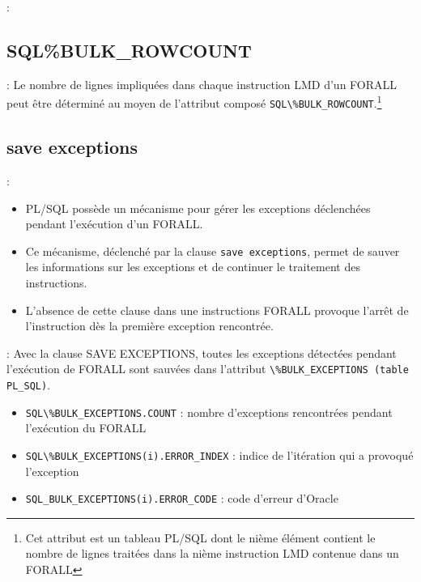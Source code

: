 \documentclass[10pt]{beamer}
\begin{document}
\begin{frame}[allowframebreaks]{\secname : \subsecname}
    
\end{frame}

\subsection{SQL\%BULK\_ROWCOUNT}
\begin{frame}{\secname : \subsecname}
    Le nombre de lignes impliquées dans chaque instruction LMD d'un FORALL peut être déterminé au moyen de l'attribut composé \lstinline[language=plsql]!SQL\%BULK_ROWCOUNT!.\footnote{Cet attribut est un tableau PL/SQL dont le nième élément contient le nombre de lignes traitées dans la nième instruction LMD contenue dans un FORALL}
\end{frame}

\subsection{save exceptions}
\begin{frame}{\secname : \subsecname}
\begin{itemize}
    \item PL/SQL possède un mécanisme pour gérer les exceptions déclenchées pendant l'exécution d'un FORALL.
    \item Ce mécanisme, déclenché par la clause \lstinline[language=plsql]!save exceptions!, permet de sauver les informations sur les exceptions et de continuer le traitement des instructions.
    \item L'absence de cette clause dans une instructions FORALL provoque l'arrêt de l'instruction dès la première exception rencontrée.
\end{itemize}
\end{frame}


\begin{frame}{\secname : \subsecname}
    Avec la clause SAVE EXCEPTIONS, toutes les exceptions détectées pendant l'exécution de FORALL sont sauvées dans l'attribut \lstinline   [language=plsql]!\%BULK_EXCEPTIONS (table PL_SQL)!.
    \begin{itemize}
        \item \lstinline[language=plsql]!SQL\%BULK_EXCEPTIONS.COUNT! : nombre d'exceptions rencontrées pendant l'exécution du FORALL
        \item \lstinline[language=plsql]!SQL\%BULK_EXCEPTIONS(i).ERROR_INDEX! : indice de l'itération qui a provoqué l'exception
        \item \lstinline[language=plsql]!SQL_BULK_EXCEPTIONS(i).ERROR_CODE! : code d'erreur d'Oracle
    \end{itemize}
\end{frame}
\end{document}

